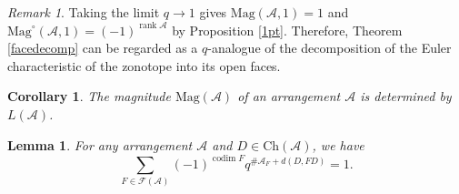 \documentclass{amsart}
\numberwithin{equation}{section}
\newtheorem{cor}[thm]{Corollary}
\theoremstyle{plain}
\newtheorem{lem}[thm]{Lemma}
\theoremstyle{remark}
\newtheorem{rem}[thm]{Remark}
\theoremstyle{definition}
\numberwithin{equation}{section}
\newcommand{\A}{\mathcal{A}}
\newcommand{\FF}{\mathcal{F}}
\newcommand{\Mag}{\mathrm{Mag}}
\newcommand{\Ch}{\mathrm{Ch}}
\DeclareMathOperator{\rank}{rank}
\DeclareMathOperator{\codim}{codim}
\begin{document}
\begin{rem}
    Taking the limit $q\to 1$ gives $\Mag(\A,1)=1$ and $\Mag^\circ(\A,1)=(-1)^{\rank \A}$ by Proposition \ref{1pt}.
    Therefore, Theorem \ref{facedecomp} can be regarded as a $q$-analogue of the decomposition of the Euler characteristic of the zonotope into its open faces.
\end{rem}

\begin{cor}
     The magnitude $\Mag(\A)$ of an arrangement $\A$ is determined by $L(\A)$.
\end{cor}

\begin{lem}\label{key_identity}
For any arrangement $\A$ and $D\in \Ch(\A)$, we have
\[
\sum_{F\in \FF(\A)}(-1)^{\codim F}q^{\#\A_F+d(D,FD)}=1.
\]
\end{lem}
\end{document}
